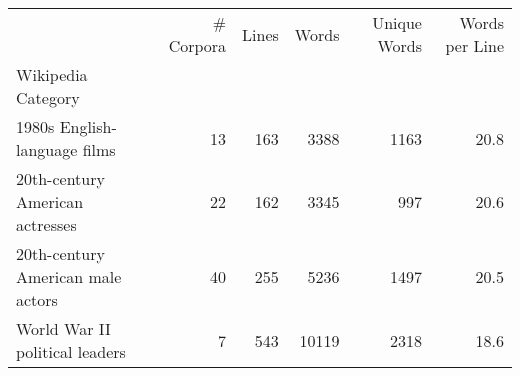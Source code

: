 \begin{tabular}{lrrrrr}
\toprule
 & \# Corpora & Lines & Words & Unique Words & Words per Line \\
Wikipedia Category &  &  &  &  &  \\
\midrule
1980s English-language films & 13 & 163 & 3388 & 1163 & 20.8 \\
20th-century American actresses & 22 & 162 & 3345 & 997 & 20.6 \\
20th-century American male actors & 40 & 255 & 5236 & 1497 & 20.5 \\
World War II political leaders & 7 & 543 & 10119 & 2318 & 18.6 \\
\bottomrule
\end{tabular}

